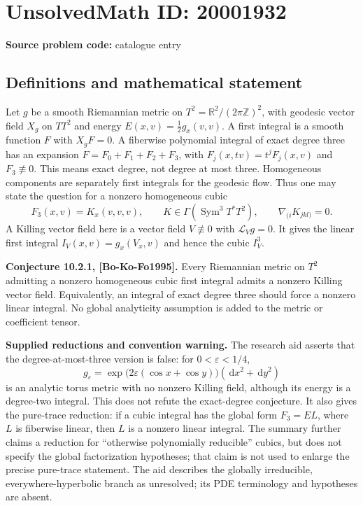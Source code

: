 \documentclass[11pt]{article}
\newcommand{\Z}{\mathbb{Z}}
\newcommand{\R}{\mathbb{R}}
\newcommand{\eps}{\varepsilon}
\newcommand{\dd}{\,\mathrm{d}}
\begin{document}
\section*{UnsolvedMath ID: 20001932}
\textbf{Source problem code:} catalogue entry
\subsection{Definitions and mathematical statement}
Let $g$ be a smooth Riemannian metric on $T^2=\R^2/(2\pi\Z)^2$, with geodesic vector field $X_g$ on $TT^2$ and energy $E(x,v)=\tfrac12g_x(v,v)$. A first integral is a smooth function $F$ with $X_gF=0$. A fiberwise polynomial integral of exact degree three has an expansion $F=F_0+F_1+F_2+F_3$, with $F_j(x,tv)=t^jF_j(x,v)$ and $F_3\not\equiv0$. This means exact degree, not degree at most three. Homogeneous components are separately first integrals for the geodesic flow. Thus one may state the question for a nonzero homogeneous cubic
\[
 F_3(x,v)=K_x(v,v,v),\qquad K\in\Gamma(\operatorname{Sym}^3T^*T^2),
 \qquad \nabla_{(i}K_{jkl)}=0.
\]
A Killing vector field here is a vector field $V\not\equiv0$ with $\mathcal L_Vg=0$. It gives the linear first integral $I_V(x,v)=g_x(V_x,v)$ and hence the cubic $I_V^3$.

\textbf{Conjecture 10.2.1, [Bo-Ko-Fo1995].} Every Riemannian metric on $T^2$ admitting a nonzero homogeneous cubic first integral admits a nonzero Killing vector field. Equivalently, an integral of exact degree three should force a nonzero linear integral. No global analyticity assumption is added to the metric or coefficient tensor.

\textbf{Supplied reductions and convention warning.} The research aid asserts that the degree-at-most-three version is false: for $0<\eps<1/4$,
\[
 g_\eps=\exp\bigl(2\eps(\cos x+\cos y)\bigr)(\dd x^2+\dd y^2)
\]
is an analytic torus metric with no nonzero Killing field, although its energy is a degree-two integral. This does not refute the exact-degree conjecture. It also gives the pure-trace reduction: if a cubic integral has the global form $F_3=E L$, where $L$ is fiberwise linear, then $L$ is a nonzero linear integral. The summary further claims a reduction for ``otherwise polynomially reducible'' cubics, but does not specify the global factorization hypotheses; that claim is not used to enlarge the precise pure-trace statement. The aid describes the globally irreducible, everywhere-hyperbolic branch as unresolved; its PDE terminology and hypotheses are absent.
\end{document}
